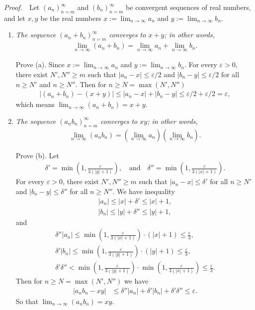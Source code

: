 \documentclass{book}
\newcommand{\pff}{\vspace{.25em}\noindent\emph{Proof.}~~}
\begin{document}
\pff Let $(a_n)_{n=m}^\infty$ and $(b_n)_{n=m}^\infty$ be convergent sequences of real numbers, and let $x,y$ be the real numbers $x:=\lim_{n\to\infty}a_n$ and $y:=\lim_{n\to\infty}b_n$.
\begin{enumerate}
    \item \emph{The sequence $(a_n+b_n)_{n=m}^\infty$ converges to $x+y$; in other words,}
    \begin{align*}
        \lim_{n\to\infty}(a_n+b_n)=\lim_{n\to\infty}a_n+\lim_{n\to\infty}b_n.
    \end{align*}

    Prove (a). Since $x:=\lim_{n\to\infty}a_n$ and $y:=\lim_{n\to\infty}b_n$. For every $\varepsilon>0$, there exist $N',N''\geq m$ such that $|a_n-x|\leq\varepsilon/2$ and $|b_n-y|\leq\varepsilon/2$ for all $n\geq N'$ and $n\geq N''$. Then for $n\geq N=\max(N',N'')$
    \begin{align*}
        |(a_n+b_n)-(x+y)|\leq|a_n-x|+|b_n-y|\leq\varepsilon/2+\varepsilon/2=\varepsilon,
    \end{align*}
    which means $\lim_{n\to\infty}(a_n+b_n)=x+y$.

    \item \emph{The sequence $(a_nb_n)_{n=m}^\infty$ converges to $xy$; in other words,}
    \begin{align*}
        \lim_{n\to\infty}(a_nb_n)=(\lim_{n\to\infty}a_n)(\lim_{n\to\infty}b_n).
    \end{align*}

    Prove (b). Let
    \begin{align*}
    \delta'=\min\left(1,\frac{\varepsilon}{3(|y|+1)}\right),\quad\text{and}\quad \delta''=\min\left(1,\frac{\varepsilon}{3(|x|+1)}\right).
    \end{align*}
    For every $\varepsilon>0$, there exist $N',N''\geq m$ such that $|a_n-x|\leq\delta'$ for all $n\geq N'$ and $|b_n-y|\leq\delta''$ for all $n\geq N''$. 
    We have inequality
    \begin{gather*}
        |a_n|\leq|x|+\delta'\leq|x|+1,\\
        |b_n|\leq|y|+\delta''\leq|y|+1,
    \end{gather*}
    and
    \begin{gather*}
        \delta''|a_n|\leq\min\left(1,\frac{\varepsilon}{3(|x|+1)}\right)\cdot(|x|+1)\leq\frac{\varepsilon}{3},\\
        \delta'|b_n|\leq\min\left(1,\frac{\varepsilon}{3(|y|+1)}\right)\cdot(|y|+1)\leq\frac{\varepsilon}{3},\\
        \delta'\delta''<\min\left(1,\frac{\varepsilon}{3(|y|+1)}\right)\cdot\min\left(1,\frac{\varepsilon}{3(|x|+1)}\right)\leq\frac{\varepsilon}{3}.
    \end{gather*}
    Then for $n\geq N=\max(N',N'')$ we have
    \begin{align*}
        |a_nb_n-xy|&\leq \delta''|a_n|+\delta'|b_n|+\delta'\delta''\leq\varepsilon.
    \end{align*}
    So that $\lim_{n\to\infty}(a_nb_n)=xy$.


\end{enumerate}
\end{document}
